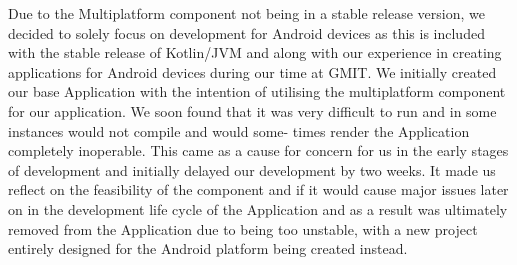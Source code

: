 Due to the Multiplatform component not being in a stable release version, we decided to solely focus on development for Android devices as this is included with the stable release of Kotlin/JVM and along with our experience in creating applications for Android devices during our time at GMIT.
\newline
\newline
We initially created our base Application with the intention of utilising the multiplatform component for our application. We soon found that it was very difficult to run and in some instances would not compile and would some- times render the Application completely inoperable. This came as a cause for concern for us in the early stages of development and initially delayed our development by two weeks. It made us reflect on the feasibility of the component and if it would cause major issues later on in the development life cycle of the Application and as a result was ultimately removed from the Application due to being too unstable, with a new project entirely designed for the Android platform being created instead.

